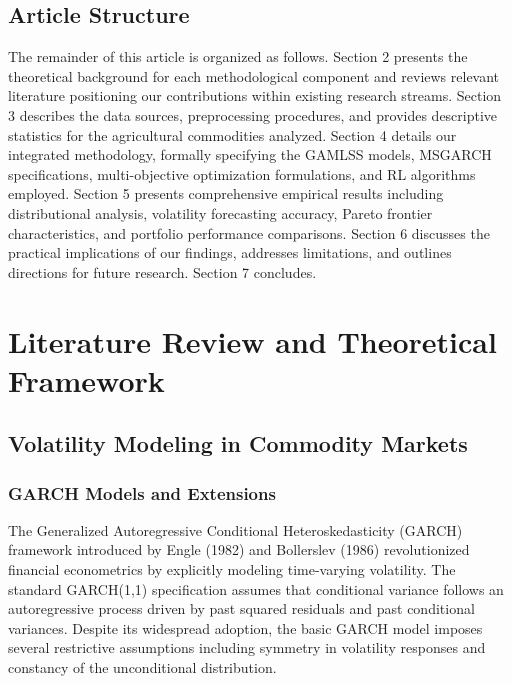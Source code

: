 \documentclass[
  10pt,
  a4paper,
]{article}
\begin{document}
\subsection{Article Structure}\label{article-structure}

The remainder of this article is organized as follows. Section 2
presents the theoretical background for each methodological component
and reviews relevant literature positioning our contributions within
existing research streams. Section 3 describes the data sources,
preprocessing procedures, and provides descriptive statistics for the
agricultural commodities analyzed. Section 4 details our integrated
methodology, formally specifying the GAMLSS models, MSGARCH
specifications, multi-objective optimization formulations, and RL
algorithms employed. Section 5 presents comprehensive empirical results
including distributional analysis, volatility forecasting accuracy,
Pareto frontier characteristics, and portfolio performance comparisons.
Section 6 discusses the practical implications of our findings,
addresses limitations, and outlines directions for future research.
Section 7 concludes.

\section{Literature Review and Theoretical
Framework}\label{sec-literature}

\subsection{Volatility Modeling in Commodity
Markets}\label{volatility-modeling-in-commodity-markets}

\subsubsection{GARCH Models and
Extensions}\label{garch-models-and-extensions}

The Generalized Autoregressive Conditional Heteroskedasticity (GARCH)
framework introduced by Engle (1982) and Bollerslev (1986)
revolutionized financial econometrics by explicitly modeling
time-varying volatility. The standard GARCH(1,1) specification assumes
that conditional variance follows an autoregressive process driven by
past squared residuals and past conditional variances. Despite its
widespread adoption, the basic GARCH model imposes several restrictive
assumptions including symmetry in volatility responses and constancy of
the unconditional distribution.
\end{document}
